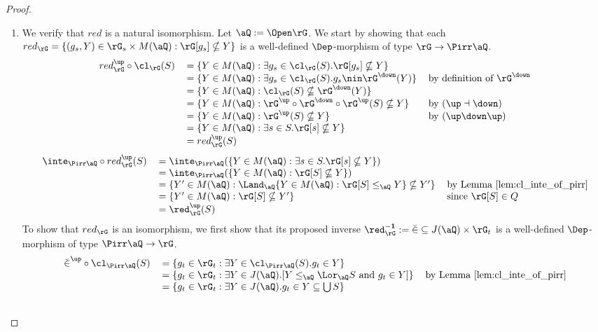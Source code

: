 \documentclass{article}
\begin{document}
\begin{proof}
\begin{enumerate}
\item
We verify that $red$ is a natural isomorphism. Let $\aQ := \Open\rG$. We start by showing that each $red_\rG = \{ (g_s,Y) \in \rG_s \times M(\aQ) : \rG[g_s] \nsubseteq Y \}$ is a well-defined $\Dep$-morphism of type $\rG \to \Pirr\aQ$.
\[
\begin{tabular}{lll}
$red_\rG^\up \circ \cl_\rG(S)$
&
$= \{ Y \in M(\aQ) : \exists g_s \in \cl_\rG(S). \rG[g_s] \nsubseteq Y \}$
\\&
$= \{ Y \in M(\aQ) : \exists g_s \in \cl_\rG(S). g_s \nin \rG^\down(Y) \}$
& by definition of $\rG^\down$
\\&
$= \{ Y \in M(\aQ) : \cl_\rG(S) \nsubseteq \rG^\down(Y) \}$
\\&
$= \{ Y \in M(\aQ) : \rG^\up \circ \rG^\down \circ \rG^\up(S) \nsubseteq Y \}$
& by $(\up\dashv\down)$
\\&
$= \{ Y \in M(\aQ) : \rG^\up(S) \nsubseteq Y \}$
& by $(\up\down\up)$
\\&
$= \{ Y \in M(\aQ) : \exists s \in S.\rG[s] \nsubseteq Y \}$
\\&
$= red_\rG^\up(S)$
\end{tabular}
\]
\[
\begin{tabular}{lll}
$\inte_{\Pirr\aQ} \circ red_\rG^\up(S)$
&
$= \inte_{\Pirr\aQ}(\{ Y \in M(\aQ) : \exists s \in S. \rG[s] \nsubseteq Y \})$
\\&
$= \inte_{\Pirr\aQ}(\{ Y \in M(\aQ) : \rG[S] \nsubseteq Y \})$
\\&
$= \{ Y' \in M(\aQ) : \Land_\aQ \{ Y \in M(\aQ) : \rG[S] \leq_\aQ Y \} \nsubseteq Y'  \}$
& by Lemma \ref{lem:cl_inte_of_pirr}
\\&
$= \{ Y' \in M(\aQ) : \rG[S] \nsubseteq Y' \}$
& since $\rG[S] \in Q$
\\&
$= \red_\rG^\up(S)$
\end{tabular}
\]
To show that $red_\rG$ is an isomorphism, we first show that its proposed inverse $\red_\rG^{\bf-1} := \breve{\in} \subseteq J(\aQ) \times \rG_t$ is a well-defined $\Dep$-morphism of type $\Pirr\aQ \to \rG$.
\[
\begin{tabular}{lll}
$\breve{\in}^\up \circ \cl_{\Pirr\aQ}(S)$
&
$= \{ g_t \in \rG_t : \exists Y \in \cl_{\Pirr\aQ}(S). g_t \in Y \}$
\\&
$= \{ g_t \in \rG_t : \exists Y \in J(\aQ).[ Y \leq_\aQ \Lor_\aQ S \text{ and } g_t \in Y   ] \}$
& by Lemma \ref{lem:cl_inte_of_pirr}
\\&
$= \{ g_t \in \rG_t : \exists Y \in J(\aQ). g_t \in Y \subseteq \bigcup S \}$
\\&

\end{tabular}\]
\end{enumerate}
\end{proof}
\end{document}
